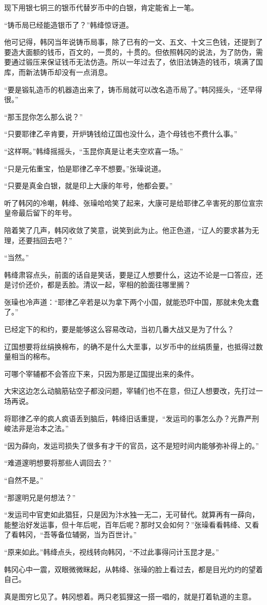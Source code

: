 现下用银七铜三的银币代替岁币中的白银，肯定能省上一笔。

“铸币局已经能造银币了？”韩绛惊讶道。

他可记得，韩冈当年说铸币局事，除了已有的一文、五文、十文三色钱，还提到了要造大面额的钱币，百文的，一贯的，十贯的。但依照韩冈的说法，为了防伪，需要通过锻压来保证钱币无法仿造。所以一年过去了，依旧法铸造的钱币，填满了国库，而新法铸币却没有一点消息。

“要是锻轧造币的机器造出来了，铸币局就可以改名造币局了。”韩冈摇头，“还早得很。”

“那玉昆你怎么那么说？”

“只要耶律乙辛肯要，开炉铸钱给辽国也没什么，造个母钱也不费什么事。”

“这样啊。”韩绛摇摇头，“玉昆你真是让老夫空欢喜一场。”

“只是元佑重宝，怕是耶律乙辛不想要。”张璪说道。

“只要是真金白银，就是印上大康的年号，他都会要。”

听了韩冈的冷嘲，韩绛、张璪哈哈笑了起来，大康可是给耶律乙辛害死的那位宣宗皇帝最后留下的年号。

陪着笑了几声，韩冈收敛了笑意，说笑到此为止。他正色道，“辽人的要求甚为无理，还要挡回去吧？”

“当然。”

韩绛肃容点头，前面的话自是笑话，要是辽人想要什么，这边不论是一口答应，还是讨价还价，都是丢脸。清议一起，宰相的脸面往哪里搁？

张璪也冷声道：“耶律乙辛若是以为拿下两个小国，就能恐吓中国，那就未免太蠢了。”

已经定下的和约，要是能够这么容易改动，当初几番大战又是为了什么？

辽国想要将丝绢换棉布，的确不是什么大垩事，以岁币中的丝绢质量，也抵得过数量相当的棉布。

可哪个宰辅都不会答应下来，只因为那是辽国提出来的条件。

大宋这边怎么动脑筋钻空子都没问题，宰辅们也不在意，但辽人想要改，先打过一场再说。

将耶律乙辛的疯人疯语丢到脑后，韩绛旧话重提，“发运司的事怎么办？光靠严刑峻法非是治本之法。”

“因为薛向，发运司损失了很多有才干的官员，这不是短时间内能够弥补得上的。”

“难道邃明想要将那些人调回去？”

“自然不是。”

“那邃明兄是何想法？”

“发运司中官吏如此猖狂，只是因为汴水独一无二，无可替代。就算再有一薛向，能整治好发运事，但十年后呢，百年后呢？那时又会如何？”张璪看看韩绛、又看了看韩冈，“吾等备位辅弼，当为百世计。”

“原来如此。”韩绛点头，视线转向韩冈，“不过此事得问计玉昆才是。”

韩冈心中一震，双眼微微眯起，从韩绛、张璪的脸上看过去，都是目光灼灼的望着自己。

真是图穷匕见了。韩冈想着。两只老狐狸这一搭一唱的，就是打着轨道的主意。
